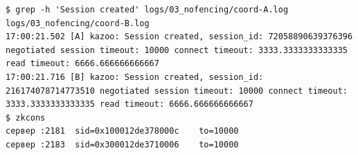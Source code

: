 \begin{Verbatim}
$ grep -h 'Session created' logs/03_nofencing/coord-A.log logs/03_nofencing/coord-B.log
17:00:21.502 [A] kazoo: Session created, session_id: 72058890639376396 negotiated session timeout: 10000 connect timeout: 3333.3333333333335 read timeout: 6666.666666666667
17:00:21.716 [B] kazoo: Session created, session_id: 216174078714773510 negotiated session timeout: 10000 connect timeout: 3333.3333333333335 read timeout: 6666.666666666667
$ zkcons
сервер :2181  sid=0x100012de378000c    to=10000
сервер :2183  sid=0x300012de3710006    to=10000
\end{Verbatim}
